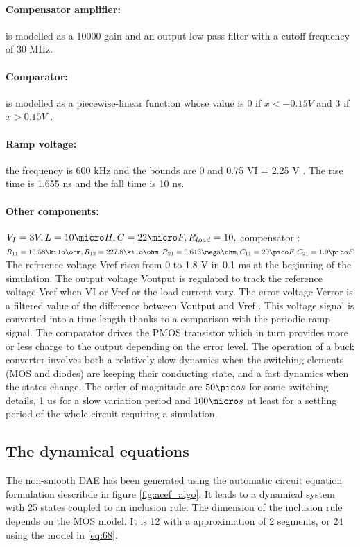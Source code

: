 \documentclass{article}
\begin{document}
\paragraph{Compensator amplifier:} is modelled as a 10000 gain and an output low-pass
filter with a cutoff frequency of 30 MHz.
\paragraph{Comparator:} is modelled as a piecewise-linear function whose value is 0 if
$x < -0.15V$ and 3 if $x > 0.15V$ .
\paragraph{Ramp voltage:} the frequency is 600 kHz and the bounds are 0 and 0.75 VI = 2.25 V .
The rise time is 1.655 ns and the fall time is 10 ns.
\paragraph{Other components:} $V_I = 3 V , L = 10 \micro H, C = 22 \micro F,R_{load} = 10,$ compensator
: $R_{11} = 15.58 \kilo \ohm , R_{12} = 227.8 \kilo \ohm ,R_{21} = 5.613 \mega \ohm, C_{11} = 20 \pico F, C_{21} =
1.9 \pico F$
The reference voltage Vref rises from 0 to 1.8 V in 0.1 ms at the beginning
of the simulation.
The output voltage Voutput is regulated to track the reference voltage Vref when
VI or Vref or the load current vary. The error voltage Verror is a filtered value
of the difference between Voutput and Vref . This voltage signal is converted
into a time length thanks to a comparison with the periodic ramp signal. The
comparator drives the PMOS transistor which in turn provides more or less
charge to the output depending on the error level. The operation of a buck
converter involves both a relatively slow dynamics when the switching elements
(MOS and diodes) are keeping their conducting state, and a fast dynamics when
the states change. The order of magnitude are $ 50 \pico s$ for some switching details,
1 us for a slow variation period and $100 \micro s$ at least for a settling period of the
whole circuit requiring a simulation.

\subsection{The dynamical equations}
\label{section41}
The non-smooth DAE has been generated using the automatic circuit equation formulation describde in figure
\ref{fig:acef_algo}. It leads to a dynamical system with 25 states coupled to an inclusion rule. The dimension of the inclusion
rule depends on the MOS model. It is 12 with a approximation of 2 segments, or 24 using the
model in \ref{eq:68}.  
\end{document}
